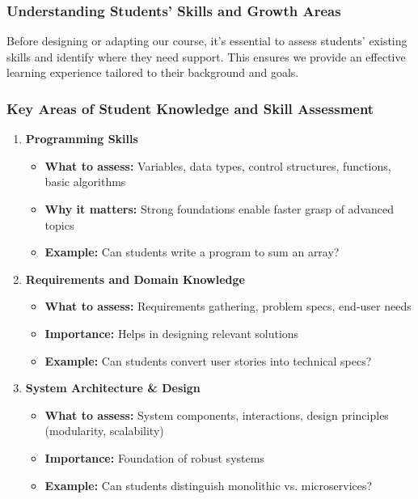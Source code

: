 \documentclass{beamer}
\begin{document}
\begin{frame}[fragile]
    \frametitle{Understanding Students' Skills and Growth Areas}
    Before designing or adapting our course, it's essential to assess students' existing skills and identify where they need support. This ensures we provide an effective learning experience tailored to their background and goals.
\end{frame}

\begin{frame}[fragile]
    \frametitle{Key Areas of Student Knowledge and Skill Assessment}
    \begin{enumerate}
        \item \textbf{Programming Skills}
        \begin{itemize}
            \item \textbf{What to assess:} Variables, data types, control structures, functions, basic algorithms
            \item \textbf{Why it matters:} Strong foundations enable faster grasp of advanced topics
            \item \textbf{Example:} Can students write a program to sum an array?
        \end{itemize}
        \vspace{0.5em}
        \item \textbf{Requirements and Domain Knowledge}
        \begin{itemize}
            \item \textbf{What to assess:} Requirements gathering, problem specs, end-user needs
            \item \textbf{Importance:} Helps in designing relevant solutions
            \item \textbf{Example:} Can students convert user stories into technical specs?
        \end{itemize}
        \vspace{0.5em}
        \item \textbf{System Architecture \& Design}
        \begin{itemize}
            \item \textbf{What to assess:} System components, interactions, design principles (modularity, scalability)
            \item \textbf{Importance:} Foundation of robust systems
            \item \textbf{Example:} Can students distinguish monolithic vs. microservices?
        \end{itemize}

\end{enumerate}
\end{frame}
\end{document}
